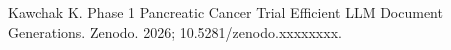 Kawchak K. Phase 1 Pancreatic Cancer Trial Efficient LLM Document Generations.
Zenodo. 2026; 10.5281/zenodo.xxxxxxxx.

\begingroup\raggedright\nocite{*}\endgroup
